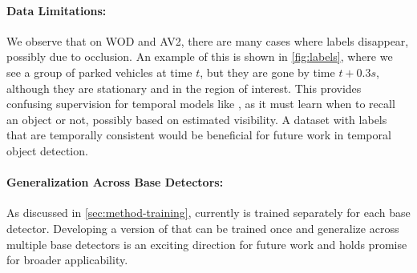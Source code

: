 \paragraph{Data Limitations:}

We observe that on WOD and AV2, there are many cases where labels disappear, possibly due to occlusion.
An example of this is shown in \cref{fig:labels}, where we see a group of parked vehicles at time $t$,
but they are gone by time $t + 0.3s$, although they are stationary and in the region of interest.
This provides confusing supervision for temporal models like \ourmodel{}, as it must learn when to recall an object or not,
possibly based on estimated visibility.
A dataset with labels that are temporally consistent would be beneficial for future work in temporal object detection.

\paragraph{Generalization Across Base Detectors:}

As discussed in \cref{sec:method-training}, currently \ourmodel{} is trained separately for each base detector.
Developing a version of \ourmodel{} that can be trained once and generalize
across multiple base detectors is an exciting direction for future work
and holds promise for broader applicability.


